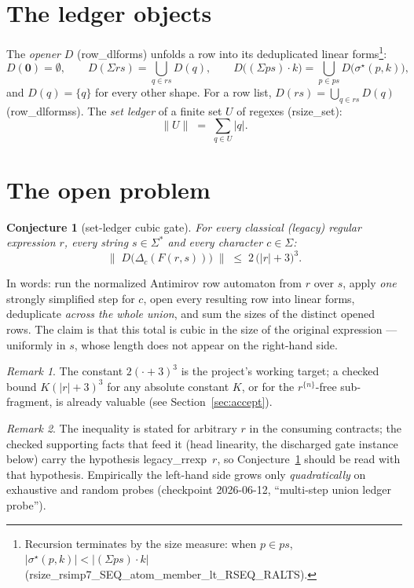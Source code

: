 \documentclass[11pt]{article}
\newtheorem{conjecture}{Conjecture}
\theoremstyle{remark}
\newtheorem{remark}{Remark}
\newcommand{\ZERO}{\mathbf{0}}
\newcommand{\rs}[1]{\lvert #1\rvert}                 %
\newcommand{\rss}[1]{\lVert #1\rVert}                %
\newcommand{\rssb}[1]{\bigl\lVert #1\bigr\rVert}      %
\newcommand{\seqstar}{\sigma^{\star}}
\newcommand{\Fact}{F}
\newcommand{\Dstep}{\Delta}
\newcommand{\open}{D}
\newcommand{\thy}[1]{\textsf{\small #1}}
\begin{document}
\section{The ledger objects}\label{sec:ledger}

The \emph{opener} $\open$ (\thy{row\_dlforms}) unfolds a row into its
deduplicated linear forms\footnote{Recursion terminates by the size measure:
when $p \in ps$, $\rs{\seqstar(p,k)} < \rs{(\Sigma ps)\cdot k}$
(\thy{rsize\_rsimp7\_SEQ\_atom\_member\_lt\_RSEQ\_RALTS}).}:
\[
\open(\ZERO)=\emptyset,\qquad
\open(\Sigma rs)=\bigcup_{q\in rs}\open(q),\qquad
\open\bigl((\Sigma ps)\cdot k\bigr)=\bigcup_{p\in ps}\open\bigl(\seqstar(p,k)\bigr),
\]
and $\open(q)=\{q\}$ for every other shape.  For a row list,
$\open(rs)=\bigcup_{q\in rs}\open(q)$ (\thy{row\_dlformss}).
The \emph{set ledger} of a finite set $U$ of regexes
(\thy{rsize\_set}):
\[
\rss{U}\;=\;\sum_{q\in U}\rs{q}.
\]

\section{The open problem}\label{sec:problem}

\begin{conjecture}[set-ledger cubic gate]\label{conj:gate}
For every classical (legacy) regular expression $r$, every string
$s\in\Sigma^{*}$ and every character $c\in\Sigma$:
\[
\boxed{\;\rssb{\;\open\bigl(\Dstep_c(\Fact(r,s))\bigr)\;}\;\le\;
   2\,\bigl(\rs{r}+3\bigr)^{3}.\;}
\]
\end{conjecture}

In words: run the normalized Antimirov row automaton from $r$ over $s$, apply
\emph{one} strongly simplified step for $c$, open every resulting row into
linear forms, deduplicate \emph{across the whole union}, and sum the sizes of
the distinct opened rows.  The claim is that this total is cubic in the size
of the original expression --- uniformly in $s$, whose length does not appear
on the right-hand side.

\begin{remark}\label{rem:constant}
The constant $2(\cdot+3)^{3}$ is the project's working target; a checked
bound $K(\rs{r}+3)^{3}$ for any absolute constant $K$, or for the
$r^{\{n\}}$-free sub-fragment, is already valuable (see
Section~\ref{sec:accept}).
\end{remark}

\begin{remark}
The inequality is stated for arbitrary $r$ in the consuming contracts; the
checked supporting facts that feed it (head linearity, the discharged gate
instance below) carry the hypothesis \thy{legacy\_rrexp}~$r$, so
Conjecture~\ref{conj:gate} should be read with that hypothesis.  Empirically
the left-hand side grows only \emph{quadratically} on exhaustive and random
probes (checkpoint 2026-06-12, ``multi-step union ledger probe'').
\end{remark}
\end{document}
